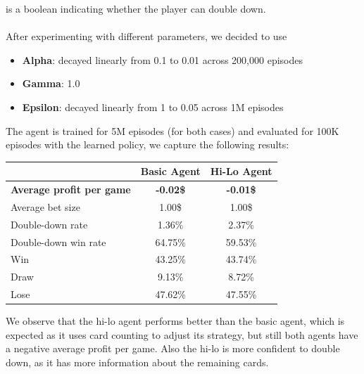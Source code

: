 \documentclass{article}
\begin{document}
 is a boolean indicating whether the player can double down.\\\\
After experimenting with different parameters, we decided to use
\begin{itemize}
  \item {\bf Alpha}: decayed linearly from 0.1 to 0.01 across 200,000 episodes
  \item {\bf Gamma}: 1.0
  \item {\bf Epsilon}: decayed linearly from 1 to 0.05 across 1M episodes
\end{itemize}

\noindent The agent is trained for 5M episodes (for both cases) and evaluated
for 100K episodes with the learned policy, we capture the following results:
\begin{table}[h!]
\centering
\begin{tabular}{|l|c|c|}
\hline
 & \textbf{Basic Agent} & \textbf{Hi-Lo Agent} \\
\hline
{\bf Average profit per game} & {\bf -0.02\$} & {\bf -0.01\$} \\
Average bet size & 1.00\$ & 1.00\$ \\
Double-down rate & 1.36\% & 2.37\% \\
Double-down win rate & 64.75\% & 59.53\% \\
Win & 43.25\% & 43.74\% \\
Draw & 9.13\% & 8.72\% \\
Lose & 47.62\% & 47.55\% \\
\hline
\end{tabular}
\end{table}

\noindent We observe that the hi-lo agent performs better than the basic agent,
which is expected as it uses card counting to adjust its strategy, but still
both agents have a negative average profit per game. Also the hi-lo is
more confident to double down, as it has more information about the remaining cards.

\newpage
\end{document}

